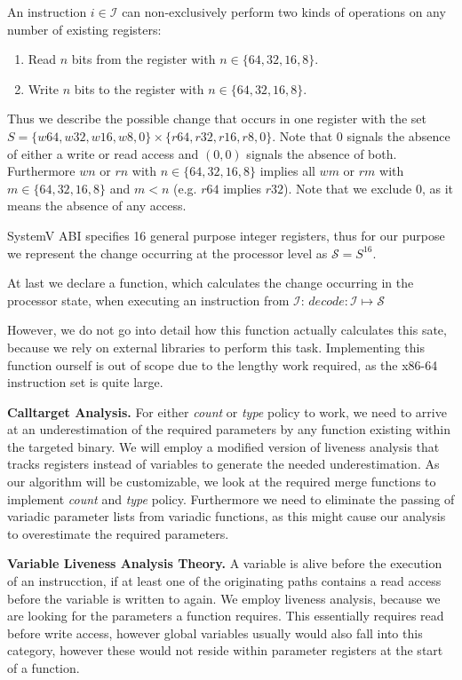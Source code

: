 An instruction $i \in \mathcal{I}$ can non-exclusively perform two kinds of operations on any number of existing registers:

\begin{enumerate}
\item Read $n$ bits from the register with $n \in \{ 64, 32, 16, 8 \}$.
\item Write $n$ bits to the register with $n \in \{ 64, 32, 16, 8 \}$.
\end{enumerate}

Thus we describe the possible change that occurs in one register with the set $S = \{ w64, w32, w16, w8, 0 \} \times \{r64, r32, r16, r8, 0 \}$. Note that 0 signals the absence of either a write or read access and $(0, 0)$ signals the absence of both. Furthermore $wn$ or $rn$ with $n \in \{64,32,16,8\}$ implies all $wm$ or $rm$ with $m \in \{64,32,16,8\}$ and $m < n$ (e.g. $r64$ implies $r32$). Note that we exclude 0, as it means the absence of any access.

SystemV ABI specifies 16 general purpose integer registers, thus for our purpose we represent the change occurring at the processor level as $\mathcal{S} = S^{16}$.

At last we declare a function, which calculates the change occurring in the processor state, when executing an instruction from $\mathcal{I}$:
$
decode : \mathcal{I} \mapsto \mathcal{S}
$

However, we do not go into detail how this function actually calculates this sate, because we rely on external libraries to perform this task. Implementing this function ourself is out of scope due to the lengthy work required, as the x86-64 instruction set is quite large.

\textbf{Calltarget Analysis.}
\label{section:calltargetanalysis}
For either \emph{count} or \emph{type} policy to work, we need to arrive at an underestimation of the required parameters by any function existing within the targeted binary. We will employ a modified version of liveness analysis that tracks registers instead of variables to generate the needed underestimation. As our algorithm will be customizable, we look at the required merge functions to implement \emph{count} and \emph{type} policy. Furthermore we need to eliminate the passing of variadic parameter lists from variadic functions, as this might cause our analysis to overestimate the required parameters.

\textbf{Variable Liveness Analysis Theory.}
\label{subsection:livenessanalysis}
A variable is alive before the execution of an instrucction, if at least one of the originating paths contains a read access before the variable is written to again. We employ liveness analysis, because we are looking for the  parameters a function requires. This essentially requires read before write access, however global variables usually would also fall into this category, however these would not reside within parameter registers at the start of a function.

